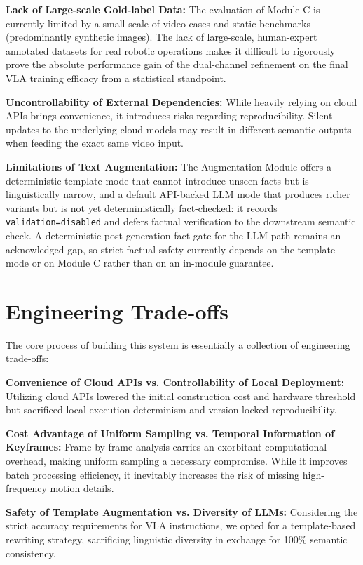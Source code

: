\documentclass[11pt,oneside]{report}
\begin{document}
\textbf{Lack of Large-scale Gold-label Data:} The evaluation of Module C is currently limited by a small scale of video cases and static benchmarks (predominantly synthetic images). The lack of large-scale, human-expert annotated datasets for real robotic operations makes it difficult to rigorously prove the absolute performance gain of the dual-channel refinement on the final VLA training efficacy from a statistical standpoint.

\textbf{Uncontrollability of External Dependencies:} While heavily relying on cloud APIs brings convenience, it introduces risks regarding reproducibility. Silent updates to the underlying cloud models may result in different semantic outputs when feeding the exact same video input.

\textbf{Limitations of Text Augmentation:} The Augmentation Module offers a deterministic template mode that cannot introduce unseen facts but is linguistically narrow, and a default API-backed LLM mode that produces richer variants but is not yet deterministically fact-checked: it records \texttt{validation=disabled} and defers factual verification to the downstream semantic check. A deterministic post-generation fact gate for the LLM path remains an acknowledged gap, so strict factual safety currently depends on the template mode or on Module C rather than on an in-module guarantee.

\section{Engineering Trade-offs}
The core process of building this system is essentially a collection of engineering trade-offs:

\textbf{Convenience of Cloud APIs vs. Controllability of Local Deployment:} Utilizing cloud APIs lowered the initial construction cost and hardware threshold but sacrificed local execution determinism and version-locked reproducibility.

\textbf{Cost Advantage of Uniform Sampling vs. Temporal Information of Keyframes:} Frame-by-frame analysis carries an exorbitant computational overhead, making uniform sampling a necessary compromise. While it improves batch processing efficiency, it inevitably increases the risk of missing high-frequency motion details.

\textbf{Safety of Template Augmentation vs. Diversity of LLMs:} Considering the strict accuracy requirements for VLA instructions, we opted for a template-based rewriting strategy, sacrificing linguistic diversity in exchange for 100\% semantic consistency.
\end{document}
